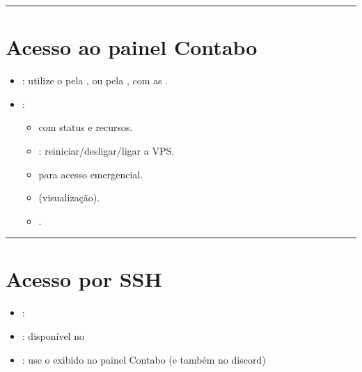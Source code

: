 \documentclass[letterpaper,10pt,brazil]{sphinxmanual}
\begin{document}
\bigskip\hrule\bigskip



\section{Acesso ao painel Contabo}
\label{\detokenize{sistemas/contabo:acesso-ao-painel-contabo}}\begin{itemize}
\item {} 
\sphinxAtStartPar
{}: utilize o  pela , ou pela ,  com as .

\item {} 
\sphinxAtStartPar
{}:
\begin{itemize}
\item {} 
\sphinxAtStartPar
{} com status e recursos.

\item {} 
\sphinxAtStartPar
{}: reiniciar/desligar/ligar a VPS.

\item {} 
\sphinxAtStartPar
{} para acesso emergencial.

\item {} 
\sphinxAtStartPar
{} (visualização).

\item {} 
\sphinxAtStartPar
{}.

\end{itemize}

\end{itemize}


\bigskip\hrule\bigskip



\section{Acesso por SSH}
\label{\detokenize{sistemas/contabo:acesso-por-ssh}}\begin{itemize}
\item {} 
\sphinxAtStartPar
{}: 

\item {} 
\sphinxAtStartPar
{}:  disponível no 

\item {} 
\sphinxAtStartPar
{}: use o  exibido no painel Contabo (e também no discord)

\end{itemize}
\end{document}
